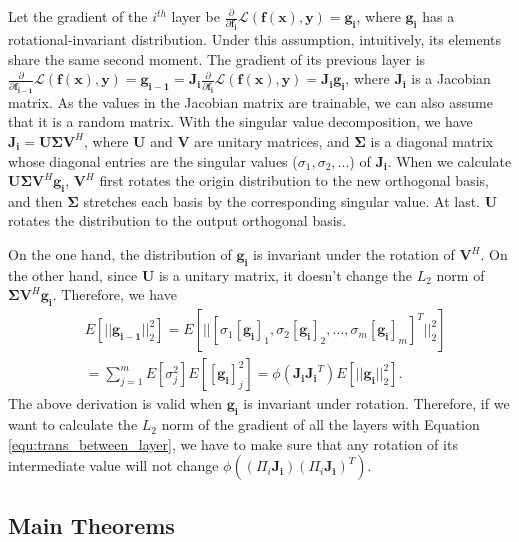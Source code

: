 \documentclass[10pt,journal,compsoc]{IEEEtran}
\begin{document}
Let the gradient of the $i^{th}$ layer be $\frac{\partial}{\partial \mathbf{f_{i}}}\mathcal{L}(\mathbf{f}(\mathbf{x}), \mathbf{y}) = \mathbf{g_i}$, where $\mathbf{g_i}$ has a rotational-invariant distribution. Under this assumption, intuitively, its elements share the same second moment. The gradient of its previous layer is $\frac{\partial}{\partial \mathbf{f_{i-1}}}\mathcal{L}(\mathbf{f}(\mathbf{x}), \mathbf{y}) = \mathbf{g_{i-1}} = \mathbf{J_i}\frac{\partial}{\partial \mathbf{f_{i}}}\mathcal{L}(\mathbf{f}(\mathbf{x}), \mathbf{y}) = \mathbf{J_ig_i}$, where $\mathbf{J_i}$ is a Jacobian matrix. As the values in the Jacobian matrix are trainable, we can also assume that it is a random matrix. With the singular value decomposition, we have $\mathbf{J_i} = \mathbf{U\Sigma V}^H$, where $\mathbf{U}$ and $\mathbf{V}$ are unitary matrices, and $\mathbf{\Sigma}$ is a diagonal matrix whose diagonal entries are the singular values ($\sigma_1, \sigma_2, ...$) of $\mathbf{J_i}$. When we calculate $\mathbf{U\Sigma V}^H\mathbf{g_i}$, $\mathbf{V}^H$ first rotates the origin distribution to the new orthogonal basis, and then $\mathbf{\Sigma}$ stretches each basis by the corresponding singular value. At last. $\mathbf{U}$ rotates the distribution to the output orthogonal basis.

On the one hand, the distribution of $\mathbf{g_i}$ is invariant under the rotation of $\mathbf{V}^H$. On the other hand, since $\mathbf{U}$ is a unitary matrix, it doesn't change the $L_2$ norm of $\mathbf{\Sigma V}^H\mathbf{g_i}$. Therefore, we have
\begin{equation}
\begin{split}
    & E\left[||\mathbf{g_{i-1}}||_2^2\right] = E\left[||[\sigma_1[\mathbf{g_i}]_1, \sigma_2[\mathbf{g_i}]_2, ..., \sigma_m [\mathbf{g_i}]_m]^T||_2^2\right]\\
    &=\sum_{j=1}^mE[\sigma_j^2]E[[\mathbf{g_i}]_j^2] = \phi\left(\mathbf{J_iJ_i}^T\right) E\left[||\mathbf{g_{i}}||_2^2\right].
\end{split}
\label{equ:trans_between_layer}
\end{equation}
The above derivation is valid when $\mathbf{g_i}$ is invariant under rotation. Therefore, if we want to calculate the $L_2$ norm of the gradient of all the layers with Equation \eqref{equ:trans_between_layer}, we have to make sure that any rotation of its intermediate value will not change $\phi\left((\Pi_{i} \mathbf{J_i})(\Pi_{i} \mathbf{J_i})^T\right)$.
\vspace{-10pt}
\subsection{Main Theorems}\label{sec:main_theorems}
\end{document}
